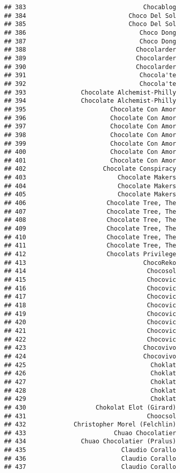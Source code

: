 \documentclass[
]{article}
\begin{document}
\begin{verbatim}
## 383                                Chocablog
## 384                            Choco Del Sol
## 385                            Choco Del Sol
## 386                               Choco Dong
## 387                               Choco Dong
## 388                              Chocolarder
## 389                              Chocolarder
## 390                              Chocolarder
## 391                               Chocola'te
## 392                               Chocola'te
## 393               Chocolate Alchemist-Philly
## 394               Chocolate Alchemist-Philly
## 395                       Chocolate Con Amor
## 396                       Chocolate Con Amor
## 397                       Chocolate Con Amor
## 398                       Chocolate Con Amor
## 399                       Chocolate Con Amor
## 400                       Chocolate Con Amor
## 401                       Chocolate Con Amor
## 402                     Chocolate Conspiracy
## 403                         Chocolate Makers
## 404                         Chocolate Makers
## 405                         Chocolate Makers
## 406                      Chocolate Tree, The
## 407                      Chocolate Tree, The
## 408                      Chocolate Tree, The
## 409                      Chocolate Tree, The
## 410                      Chocolate Tree, The
## 411                      Chocolate Tree, The
## 412                      Chocolats Privilege
## 413                                ChocoReko
## 414                                 Chocosol
## 415                                 Chocovic
## 416                                 Chocovic
## 417                                 Chocovic
## 418                                 Chocovic
## 419                                 Chocovic
## 420                                 Chocovic
## 421                                 Chocovic
## 422                                 Chocovic
## 423                                Chocovivo
## 424                                Chocovivo
## 425                                  Choklat
## 426                                  Choklat
## 427                                  Choklat
## 428                                  Choklat
## 429                                  Choklat
## 430                   Chokolat Elot (Girard)
## 431                                 Choocsol
## 432             Christopher Morel (Felchlin)
## 433                        Chuao Chocolatier
## 434               Chuao Chocolatier (Pralus)
## 435                          Claudio Corallo
## 436                          Claudio Corallo
## 437                          Claudio Corallo

\end{verbatim}
\end{document}
